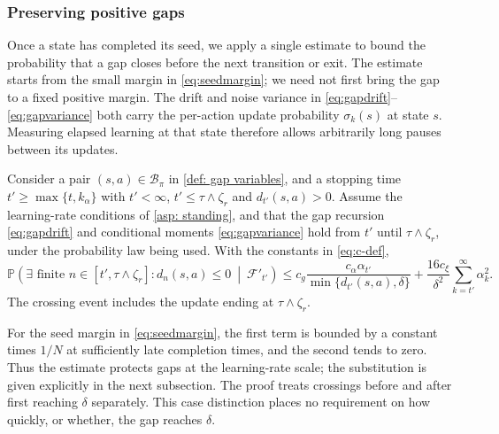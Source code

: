 \subsubsection{Preserving positive gaps}
Once a state has completed its seed, we apply a single estimate to bound the probability that a gap closes before the next transition or exit. The estimate starts from the small margin in \eqref{eq:seedmargin}; we need not first bring the gap to a fixed positive margin. The drift and noise variance in \eqref{eq:gapdrift}--\eqref{eq:gapvariance} both carry the per-action update probability $\sigma_k(s)$ at state $s$. Measuring elapsed learning at that state therefore allows arbitrarily long pauses between its updates.

\begin{lemma}
\label{lem:barrier}
Consider a pair $(s,a)\in\mathcal B_\pi$ in \autoref{def: gap variables}, and a stopping time $t'\ge\max\{t,k_\alpha\}$ with $t'<\infty$, $t'\le\tau\wedge\zeta_r$ and $d_{t'}(s,a)>0$.
Assume the learning-rate conditions of \autoref{asp: standing}, and that the gap recursion \eqref{eq:gapdrift} and conditional moments \eqref{eq:gapvariance} hold from $t'$ until $\tau\wedge\zeta_r$, under the probability law being used. With the constants in \eqref{eq:c-def},
\begin{equation}
\label{eq:barrier}
\mathbb P\!\left(\exists\text{ finite }n\in[t',\tau\wedge\zeta_r]:d_n(s,a)\le0\ \middle|\ \mathcal F'_{t'}\right)
\le c_g\frac{c_\alpha\alpha_{t'}}{\min\{d_{t'}(s,a),\delta\}}
+\frac{16c_\xi}{\delta^2}\sum_{k=t'}^\infty\alpha_k^2.
\end{equation}
The crossing event includes the update ending at $\tau\wedge\zeta_r$.
\end{lemma}
For the seed margin in \eqref{eq:seedmargin}, the first term is bounded by a constant times $1/N$ at sufficiently late completion times, and the second tends to zero. Thus the estimate protects gaps at the learning-rate scale; the substitution is given explicitly in the next subsection. The proof treats crossings before and after first reaching $\delta$ separately. This case distinction places no requirement on how quickly, or whether, the gap reaches $\delta$.

